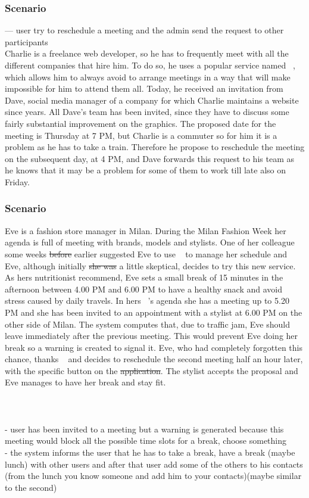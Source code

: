 \subsubsection{Scenario \thecountScenarios }
--- user try to reschedule a meeting and the admin send the request to other participants\\

Charlie is a freelance web developer, so he has to frequently meet with all the different companies that hire him. To do so, he uses a popular service named \projectname~, which allows him to always avoid to arrange meetings in a way that will make impossible for him to attend them all. Today, he received an invitation from Dave, social media manager of a company for which Charlie maintains a website since years. All Dave's team has been invited, since they have to discuss some fairly substantial improvement on the graphics. The proposed date for the meeting is Thursday at 7 PM, but Charlie is a commuter so for him it is a problem as he has to take a train. Therefore he propose to reschedule the meeting on the subsequent day, at 4 PM, and Dave forwards this request to his team as he knows that it may be a problem for some of them to work till late also on Friday.


\subsubsection{Scenario \thecountScenarios }
Eve is a fashion store manager in Milan. During the Milan Fashion Week her agenda is full of meeting with brands, models and stylists. One of her colleague some weeks \st{before} earlier suggested Eve to use \projectname~ to manage her schedule and Eve, although initially \st{she was} a little skeptical, decides to try this new service. As hers nutritionist recommend, Eve sets a small break of 15 minutes in the afternoon between 4.00 PM and 6.00 PM to have a healthy snack and avoid stress caused by daily travels. In hers \projectname~'s agenda she has a meeting up to 5.20 PM and she has been invited to an appointment with a stylist at 6.00 PM on the other side of Milan. The system computes that, due to traffic jam, Eve should leave immediately after the previous meeting. This would prevent Eve doing her break so a warning is created to signal it. Eve, who had completely forgotten this chance, thanks \projectname~ and decides to reschedule the second meeting half an hour later, with the specific button on the \st{application}. The stylist accepts the proposal and Eve manages to have her break and stay fit.
\\
\\
\\
\\
- user has been invited to a meeting but a warning is generated because this meeting would block all the possible time slots for a break, choose something\\
- the system informs the user that he has to take a break, have a break (maybe lunch) with other users and after that user add some of the others to his contacts (from the lunch you know someone and add him to your contacts)(maybe similar to the second)\\


